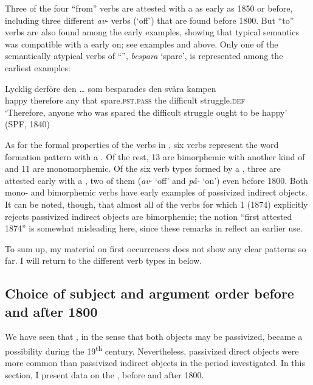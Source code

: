 \documentclass[output=paper]{langscibook}
\begin{document}
Three of the four “from” verbs are attested with a  as early as 1850 or before, including three different \textit{av}{}- verbs (‘off’) that are found before 1800. But “to” verbs are also found among the early examples, showing that typical  semantics was compatible with a  early on; see examples  and  above. Only one of the semantically atypical verbs of “”, \textit{bespara} ‘spare’, is represented among the earliest examples:


\ea%
    \label{ex:falk:19}
\gll Lycklig  derföre    den  …  som  besparades      den  svåra    kampen\\
    happy  therefore  any  {}    that  spare.\textsc{pst}.\textsc{pass}  the  difficult  struggle.\textsc{def}\\
\glt ‘Therefore, anyone who was spared the difficult struggle ought to be happy’ (SPF, 1840)
\z

As for the formal properties of the verbs in , six verbs represent the word formation pattern with a . Of the rest, 13 are bimorphemic with another kind of  and 11 are monomorphemic. Of the six verb types formed by a , three are attested early with a , two of them (\textit{av}{}- ‘off’ and \textit{på-} ‘on’) even before 1800. Both mono- and bimorphemic verbs have early examples of passivized indirect objects. It can be noted, though, that almost all of the verbs for which  1 (1874) explicitly rejects passivized indirect objects are bimorphemic; the notion “first attested 1874” is somewhat misleading here, since these remarks in  reflect an earlier use.


To sum up, my material on first occurrences does not show any clear patterns so far. I will return to the different verb types in  below.


\subsection{Choice of subject and argument order before and after 1800}\label{sec:falk:3.8}


We have seen that , in the sense that both objects may be passivized, became a possibility during the 19\textsuperscript{th} century. Nevertheless, passivized direct objects were more common than passivized indirect objects in the period investigated. In this section, I present data on the , before and after 1800.
\end{document}
